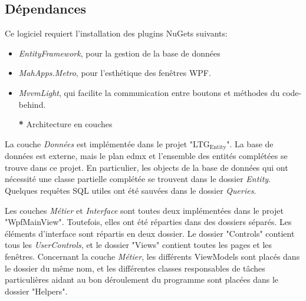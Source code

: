 \documentclass[a4paper, oneside]{article}
\begin{document}
\subsection{Dépendances}
\label{sec:org5391ffa}
Ce logiciel requiert l'installation des plugins NuGets suivants:
\begin{itemize}
\item \emph{EntityFramework}, pour la gestion de la base de données
\item \emph{MahApps.Metro}, pour l'esthétique des fenêtres WPF.
\item \emph{MvvmLight}, qui facilite la communication entre boutons et méthodes
du code-behind.

\textbf{*} Architecture en couches
\end{itemize}
La couche \emph{Données} est implémentée dans le projet "LTG\(_{\text{Entity}}\)". La base
de données est externe, mais le plan edmx et l'ensemble des entités
complétées se trouve dans ce projet. En particulier, les objects de la
base de données qui ont nécessité une classe partielle complétée se
trouvent dans le dossier \emph{Entity}. Quelques requêtes SQL utiles ont
été sauvées dans le dossier \emph{Queries}.

Les couches \emph{Métier} et \emph{Interface} sont toutes deux implémentées dans
le projet "WpfMainView". Toutefois, elles ont été réparties dans des
dossiers séparés. Les éléments d'interface sont répartis en deux
dossier. Le dossier "Controls" contient tous les \emph{UserControls}, et le
dossier "Views" contient toutes les pages et les fenêtres. Concernant
la couche \emph{Métier}, les différents ViewModels sont placés dans le
dossier du même nom, et les différentes classes responsables de tâches
particulières aidant au bon déroulement du programme sont placées dans
le dossier "Helpers".
\end{document}
